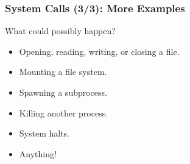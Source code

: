 \begin{frame}

\frametitle{System Calls (3/3): More Examples}

\vspace{\fill}

What could possibly happen?

\begin{itemize}

\item Opening, reading, writing, or closing a file.

\item Mounting a file system.

\item Spawning a subprocess.

\item Killing another process.

\item System halts.

\item Anything!

\end{itemize}

\vspace{\fill}

\end{frame}
